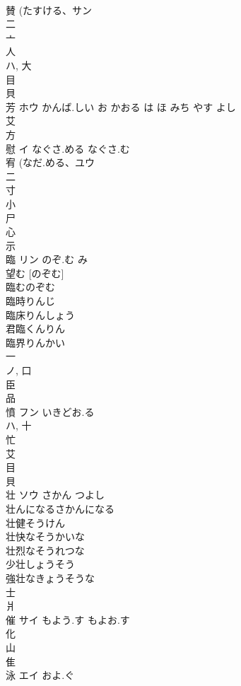 \documentclass[8pt]{extreport}
\begin{document}
\begin{CJK}{UTF8}{min}
\\	賛 (たすける、サン 
\\	二 
\\	亠 
\\	人 
\\	ハ, 大 
\\	目 
\\	貝 
\\	芳	ホウ	かんば.しい お かおる は ほ みち やす よし	
\\	艾 
\\	方 
\\	慰	イ	なぐさ.める なぐさ.む	
\\	宥 (なだ.める、ユウ 
\\	二 
\\	寸 
\\	小 
\\	尸 
\\	心 
\\	示 
\\	臨	リン	のぞ.む み	
\\	望む [のぞむ] 
\\	臨むのぞむ
\\	臨時りんじ
\\	臨床りんしょう
\\	君臨くんりん
\\	臨界りんかい
\\	一 
\\	ノ, 口 
\\	臣 
\\	品 
\\	憤	フン	いきどお.る	
\\	ハ, 十 
\\	忙 
\\	艾 
\\	目 
\\	貝 
\\	壮	ソウ	さかん つよし	
\\	壮んになるさかんになる
\\	壮健そうけん
\\	壮快なそうかいな
\\	壮烈なそうれつな
\\	少壮しょうそう
\\	強壮なきょうそうな
\\	士 
\\	爿 
\\	催	サイ	もよう.す もよお.す	
\\	化 
\\	山 
\\	隹 
\\	泳	エイ	およ.ぐ	

\end{CJK}
\end{document}
